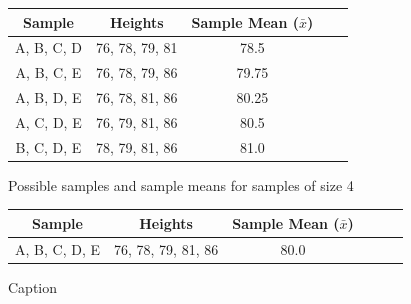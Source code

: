 \documentclass[12pt,a4paper]{article}
\theoremstyle{example}
\theoremstyle{definition}
\theoremstyle{theorem}
\begin{document}
\begin{figure}[H]
    \centering
    \begin{tabular}{|c|c|c|c|c|}
  \hline
  Sample & Heights & Sample Mean (\(\bar{x}\)) \\
  \hline
  A, B, C, D & 76, 78, 79, 81 & 78.5 \\
  A, B, C, E & 76, 78, 79, 86 & 79.75 \\
  A, B, D, E & 76, 78, 81, 86 & 80.25 \\
  A, C, D, E & 76, 79, 81, 86 & 80.5 \\
  B, C, D, E & 78, 79, 81, 86 & 81.0 \\
  \hline
\end{tabular}

    \caption{Possible samples and sample means for samples of size 4}
    \label{fig:enter-label}
\end{figure}
\begin{figure}[H]
    \centering
    \begin{tabular}{|c|c|c|c|c|c|}
  \hline
  Sample & Heights & Sample Mean (\(\bar{x}\)) \\
  \hline
  A, B, C, D, E & 76, 78, 79, 81, 86 & 80.0 \\
  \hline
\end{tabular}

    \caption{Caption}
    \label{fig:enter-label}
\end{figure}
\pagebreak
\end{document}
